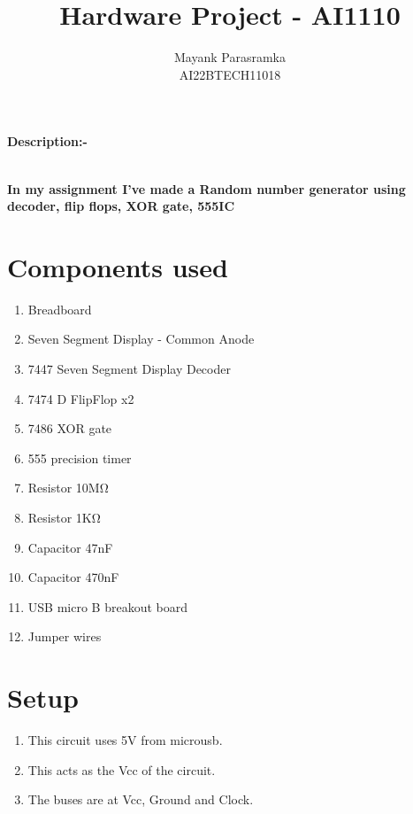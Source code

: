\documentclass[journal,12pt,twocolumn]{IEEEtran}
\begin{document}
		\title{
				Hardware Project - AI1110
		}
		\author{Mayank Parasramka\\
			AI22BTECH11018
		}	
		
\maketitle

\newpage
\bigskip
\renewcommand{\thefigure}{\theenumi}
\renewcommand{\thetable}{\theenumi}
\textbf{Description:-} \raggedright\\
\textbf{In my assignment I've made a Random number generator using decoder, flip flops, XOR gate, 555IC}
\tableofcontents
\section{Components used}
\begin{enumerate}[label=(\roman*)]
\item Breadboard
\item Seven Segment Display - Common Anode
\item 7447 Seven Segment Display Decoder
\item 7474 D FlipFlop x2
\item 7486 XOR gate
\item 555 precision timer
\item Resistor 10MΩ
\item Resistor 1KΩ
\item Capacitor 47nF
\item Capacitor 470nF
\item USB micro B breakout board
\item Jumper wires
\end{enumerate}
\section{Setup}
\begin{enumerate}
\item This circuit uses 5V from microusb.
\item This acts as the Vcc of the circuit.
\item The buses are at Vcc, Ground and Clock.
\end{enumerate}
\end{document}
